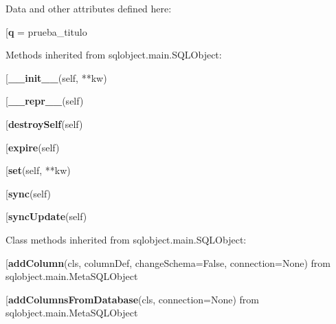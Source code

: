 Data and other attributes defined here:\\
\begin{description}\item[{\bf q} = prueba\_titulo\end{description}


Methods inherited from sqlobject.main.SQLObject:\\
\begin{description}\item[{\bf \_\_init\_\_}(self, **kw)\end{description}

\begin{description}\item[{\bf \_\_repr\_\_}(self)\end{description}

\begin{description}\item[{\bf destroySelf}(self)\end{description}

\begin{description}\item[{\bf expire}(self)\end{description}

\begin{description}\item[{\bf set}(self, **kw)\end{description}

\begin{description}\item[{\bf sync}(self)\end{description}

\begin{description}\item[{\bf syncUpdate}(self)\end{description}


Class methods inherited from sqlobject.main.SQLObject:\\
\begin{description}\item[{\bf addColumn}(cls, columnDef, changeSchema=False, connection=None) from sqlobject.main.MetaSQLObject\end{description}

\begin{description}\item[{\bf addColumnsFromDatabase}(cls, connection=None) from sqlobject.main.MetaSQLObject\end{description}


